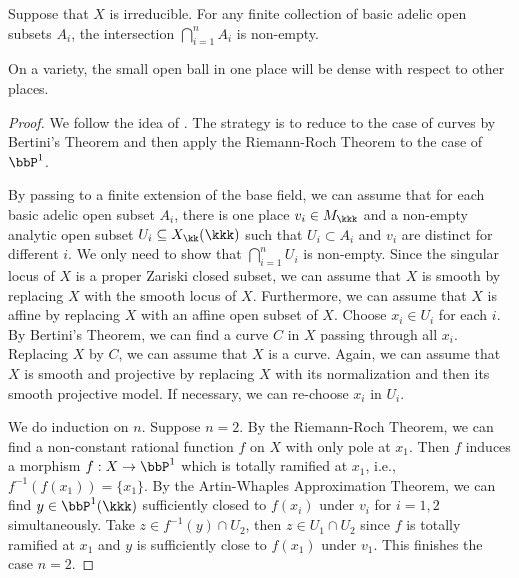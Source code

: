     \begin{lemma}\label{lem:intersection_of_basic_adelic_subset_is_nonempty}
        Suppose that \(X\) is irreducible.
        For any finite collection of basic adelic open subsets \(A_i\), the intersection \(\bigcap_{i=1}^n A_i\) is non-empty.
    \end{lemma}
    \begin{slogan}
        On a variety, the small open ball in one place will be dense with respect to other places.
    \end{slogan}
    \begin{proof}
        We follow the idea of \cite{ManZan14:AWapproxOnVarieties}.
        The strategy is to reduce to the case of curves by Bertini's Theorem and then apply the Riemann-Roch Theorem to the case of \(\bbP^1\).

        By passing to a finite extension of the base field, we can assume that for each basic adelic open subset \(A_i\),
        there is one place \(v_i \in M_\kkk\) and a non-empty analytic open subset \(U_i \subseteq X_{\kk}(\kkk)\) such that \(U_i \subset A_i\) and \(v_i\) are distinct for different \(i\).
        We only need to show that \(\bigcap_{i=1}^n U_i\) is non-empty.
        Since the singular locus of \(X\) is a proper Zariski closed subset, we can assume that \(X\) is smooth by replacing \(X\) with the smooth locus of \(X\).
        Furthermore, we can assume that \(X\) is affine by replacing \(X\) with an affine open subset of \(X\).
        Choose \(x_i \in U_i\) for each \(i\).
        By Bertini's Theorem, we can find a curve \(C\) in \(X\) passing through all \(x_i\).
        Replacing \(X\) by \(C\), we can assume that \(X\) is a curve.
        Again, we can assume that \(X\) is smooth and projective by replacing \(X\) with its normalization and then its smooth projective model.
        If necessary, we can re-choose \(x_i\) in \(U_i\).

        We do induction on \(n\).
        Suppose \(n=2\).
        By the Riemann-Roch Theorem, we can find a non-constant rational function \(f\) on \(X\) with only pole at \(x_1\).
        Then \(f\) induces a morphism \(f: X \to \bbP^1\) which is totally ramified at \(x_1\), i.e., \(f^{-1}(f(x_1)) = \{x_1\}\).
        By the Artin-Whaples Approximation Theorem, we can find \(y \in \bbP^1(\kkk)\) sufficiently closed to \(f(x_i)\) under \(v_i\) for \(i=1,2\) simultaneously.
        Take \(z \in f^{-1}(y) \cap U_2\), then \(z \in U_1 \cap U_2\) since \(f\) is totally ramified at \(x_1\) and \(y\) is sufficiently close to \(f(x_1)\) under \(v_1\).
        This finishes the case \(n=2\).


\end{proof}
